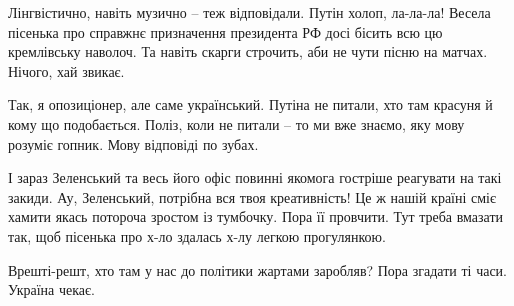 Лінгвістично, навіть музично – теж відповідали. Путін холоп, ла-ла-ла! Весела
пісенька про справжнє призначення президента РФ досі бісить всю цю кремлівську
наволоч. Та навіть скарги строчить, аби не чути пісню на матчах. Нічого, хай
звикає.

Так, я опозиціонер, але саме український. Путіна не питали, хто там красуня й
кому що подобається. Поліз, коли не питали – то ми вже знаємо, яку мову розуміє
гопник. Мову відповіді по зубах.

І зараз Зеленський та весь його офіс повинні якомога гостріше реагувати на такі
закиди. Ау, Зеленський, потрібна вся твоя креативність! Це ж нашій країні сміє
хамити якась потороча зростом із тумбочку. Пора її провчити. Тут треба вмазати
так, щоб пісенька про х-ло здалась х-лу легкою прогулянкою.

Врешті-решт, хто там у нас до політики жартами заробляв? Пора згадати ті часи.
Україна чекає.
